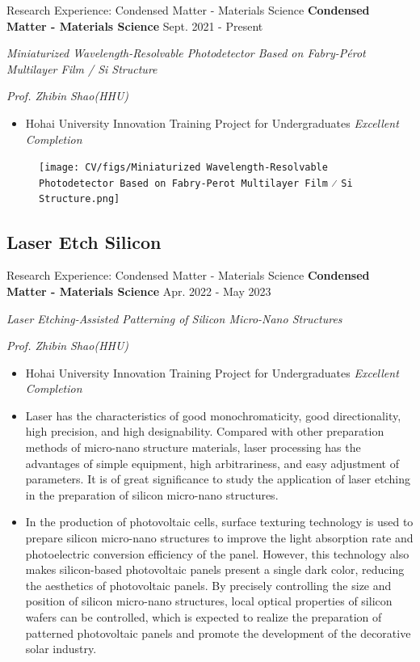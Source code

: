 \documentclass[9pt,aspectratio=169,hyperref=colorlinks]{beamer}
\begin{document}
\begin{frame}{Research Experience: Condensed Matter - Materials Science}
    \medskip \textbf{Condensed Matter - Materials Science} \hfill Sept. 2021 - Present

    \quad \textit{Miniaturized Wavelength-Resolvable Photodetector Based on Fabry-P\'{e}rot Multilayer Film / Si Structure}

    \hfill \textit{Prof. Zhibin Shao(HHU)}

    \begin{itemize}
        \item Hohai University Innovation Training Project for Undergraduates \textit{Excellent Completion}
    \end{itemize}

    \begin{figure}
        \centering
        \texttt{[image: CV/figs/Miniaturized Wavelength-Resolvable Photodetector Based on Fabry-Perot Multilayer Film ⁄ Si Structure.png]}
    \end{figure}
\end{frame}

\subsection{Laser Etch Silicon}
\begin{frame}{Research Experience: Condensed Matter - Materials Science}
    \medskip \textbf{Condensed Matter - Materials Science} \hfill Apr. 2022 - May 2023

    \quad \textit{Laser Etching-Assisted Patterning of Silicon Micro-Nano Structures}

    \hfill \textit{Prof. Zhibin Shao(HHU)}

    \begin{itemize}
        \item Hohai University Innovation Training Project for Undergraduates \textit{Excellent Completion}
        \item Laser has the characteristics of good monochromaticity, good directionality, high precision, and high designability. Compared with other preparation methods of micro-nano structure materials, laser processing has the advantages of simple equipment, high arbitrariness, and easy adjustment of parameters. It is of great significance to study the application of laser etching in the preparation of silicon micro-nano structures.
        \item In the production of photovoltaic cells, surface texturing technology is used to prepare silicon micro-nano structures to improve the light absorption rate and photoelectric conversion efficiency of the panel. However, this technology also makes silicon-based photovoltaic panels present a single dark color, reducing the aesthetics of photovoltaic panels. By precisely controlling the size and position of silicon micro-nano structures, local optical properties of silicon wafers can be controlled, which is expected to realize the preparation of patterned photovoltaic panels and promote the development of the decorative solar industry.
    \end{itemize}
\end{frame}
\end{document}
